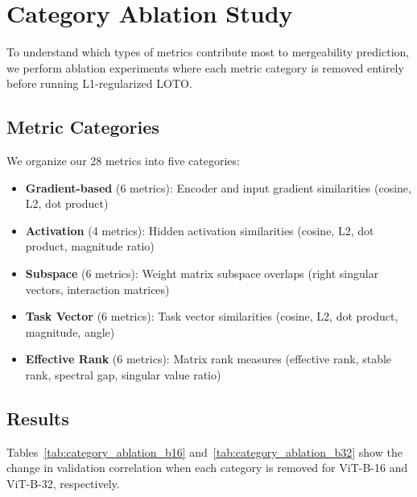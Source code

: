 \section{Category Ablation Study}
\label{sec:category_ablation}

To understand which types of metrics contribute most to mergeability prediction, we perform ablation experiments where each metric category is removed entirely before running L1-regularized LOTO.

\subsection{Metric Categories}

We organize our 28 metrics into five categories:
\begin{itemize}
    \item \textbf{Gradient-based} (6 metrics): Encoder and input gradient similarities (cosine, L2, dot product)
    \item \textbf{Activation} (4 metrics): Hidden activation similarities (cosine, L2, dot product, magnitude ratio)
    \item \textbf{Subspace} (6 metrics): Weight matrix subspace overlaps (right singular vectors, interaction matrices)
    \item \textbf{Task Vector} (6 metrics): Task vector similarities (cosine, L2, dot product, magnitude, angle)
    \item \textbf{Effective Rank} (6 metrics): Matrix rank measures (effective rank, stable rank, spectral gap, singular value ratio)
\end{itemize}

\subsection{Results}

Tables~\ref{tab:category_ablation_b16} and~\ref{tab:category_ablation_b32} show the change in validation correlation when each category is removed for ViT-B-16 and ViT-B-32, respectively.

